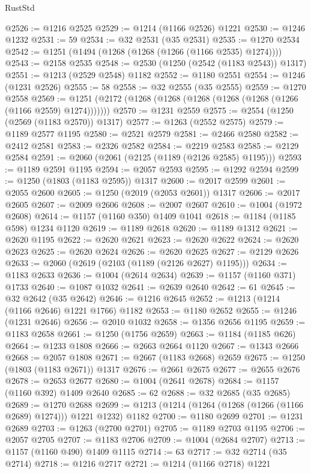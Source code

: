 \begin{lexlean}{RustStd}
\begin{coremodule}
@2526 := @1216 @2525
@2529 := @1214 (@1166 @2526) @1221
@2530 := @1246 @1232
@2531 := 59
@2534 := @32 @2531 (@35 @2531)
@2535 := @1270 @2534
@2542 := @1251 (@1494 (@1268 (@1268 (@1266 (@1166 @2535) @1274))))
@2543 := @2158 @2535
@2548 := @2530 (@1250 (@2542 (@1183 @2543)) @1317)
@2551 := @1213 (@2529 @2548) @1182
@2552 := @1180 @2551
@2554 := @1246 (@1231 @2526)
@2555 := 58
@2558 := @32 @2555 (@35 @2555)
@2559 := @1270 @2558
@2569 := @1251 (@2172 (@1268 (@1268 (@1268 (@1268 (@1268 (@1266 (@1166 @2559) @1274)))))))
@2570 := @1231 @2559
@2575 := @2554 (@1250 (@2569 (@1183 @2570)) @1317)
@2577 := @1263 (@2552 @2575)
@2579 := @1189 @2577 @1195
@2580 := @2521 @2579
@2581 := @2466 @2580
@2582 := @2412 @2581
@2583 := @2326 @2582
@2584 := @2219 @2583
@2585 := @2129 @2584
@2591 := @2060 (@2061 (@2125 (@1189 (@2126 @2585) @1195)))
@2593 := @1189 @2591 @1195
@2594 := @2057 @2593
@2595 := @1292 @2594
@2599 := @1250 (@1803 (@1183 @2595)) @1317
@2600 := @2017 @2599
@2601 := @2055 @2600
@2605 := @1250 (@2019 (@2053 @2601)) @1317
@2606 := @2017 @2605
@2607 := @2009 @2606
@2608 := @2007 @2607
@2610 := @1004 (@1972 @2608)
@2614 := @1157 (@1160 @350) @1409 @1041
@2618 := @1184 (@1185 @598) @1234 @1120
@2619 := @1189 @2618
@2620 := @1189 @1312
@2621 := @2620 @1195
@2622 := @2620 @2621
@2623 := @2620 @2622
@2624 := @2620 @2623
@2625 := @2620 @2624
@2626 := @2620 @2625
@2627 := @2129 @2626
@2633 := @2060 (@2619 (@2103 (@1189 (@2126 @2627) @1195)))
@2634 := @1183 @2633
@2636 := @1004 (@2614 @2634)
@2639 := @1157 (@1160 @371) @1733
@2640 := @1087 @1032
@2641 := @2639 @2640
@2642 := 61
@2645 := @32 @2642 (@35 @2642)
@2646 := @1216 @2645
@2652 := @1213 (@1214 (@1166 @2646) @1221 @1766) @1182
@2653 := @1180 @2652
@2655 := @1246 (@1231 @2646)
@2656 := @2010 @1032
@2658 := @1356 @2656 @1195
@2659 := @1183 @2658
@2661 := @1250 (@1756 @2659)
@2663 := @1184 (@1185 @626)
@2664 := @1233 @1808
@2666 := @2663 @2664 @1120
@2667 := @1343 @2666
@2668 := @2057 @1808
@2671 := @2667 (@1183 @2668) @2659
@2675 := @1250 (@1803 (@1183 @2671)) @1317
@2676 := @2661 @2675
@2677 := @2655 @2676
@2678 := @2653 @2677
@2680 := @1004 (@2641 @2678)
@2684 := @1157 (@1160 @392) @1409 @2640
@2685 := 62
@2688 := @32 @2685 (@35 @2685)
@2689 := @1270 @2688
@2699 := @1213 (@1214 (@1264 (@1268 (@1266 (@1166 @2689) @1274))) @1221 @1232) @1182
@2700 := @1180 @2699
@2701 := @1231 @2689
@2703 := @1263 (@2700 @2701)
@2705 := @1189 @2703 @1195
@2706 := @2057 @2705
@2707 := @1183 @2706
@2709 := @1004 (@2684 @2707)
@2713 := @1157 (@1160 @490) @1409 @1115
@2714 := 63
@2717 := @32 @2714 (@35 @2714)
@2718 := @1216 @2717
@2721 := @1214 (@1166 @2718) @1221

\end{coremodule}
\end{lexlean}
